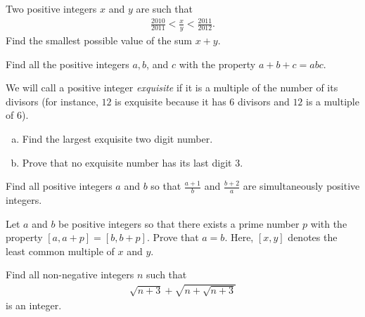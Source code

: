\documentclass[problems.tex]{subfile}
\begin{document}
	\begin{problem}
		Two positive integers $x$ and $y$ are such that
		\begin{align*}
			\frac{2010}{2011} < \frac{x}{y} < \frac{2011}{2012}.
		\end{align*}
		Find the smallest possible value of the sum $x + y$.
	\end{problem}


	\begin{problem}
		Find all the positive integers $a, b$, and $c$ with the property $a + b + c = abc$.
	\end{problem}



	\begin{problem}
		We will call a positive integer \textit{exquisite} if it is a multiple of the number of its divisors (for instance, $12$ is exquisite because it has $6$ divisors and $12$ is a multiple	of $6$).
		\begin{enumerate}[(a)]
			\item Find the largest exquisite two digit number.
			\item Prove that no exquisite number has its last digit $3$.
		\end{enumerate}
	\end{problem}



	\begin{problem}
		Find all positive integers $a$ and $b$ so that $\frac{a + 1}{b}$ and $\frac{b+2}{a}$ are simultaneously positive integers.
	\end{problem}



	\begin{problem}
		Let $a$ and $b$ be positive integers so that there exists a prime number $p$ with the property $[a, a + p] = [b, b + p]$. Prove that $a = b$. Here, $[x, y]$ denotes the least common multiple of $x$ and $y$.
	\end{problem}



	\begin{problem}
		Find all non-negative integers $n$ such that
		\begin{align*}
			\sqrt{n+3} + \sqrt{n+\sqrt{n+3}}
		\end{align*}
		is an integer.
	\end{problem}
\end{document}

